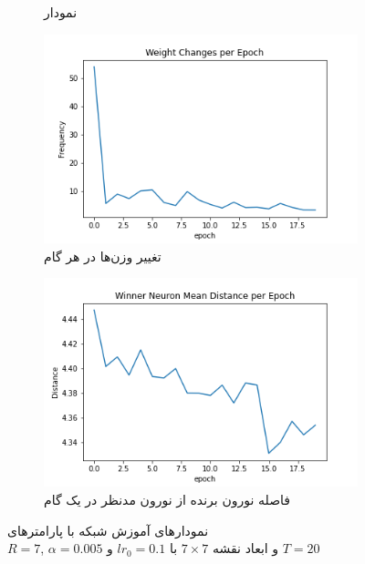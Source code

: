 \documentclass[12pt, a4paper]{article}
\begin{document}
\begin{figure}[h]
\begin{subfigure}{0.45\linewidth}
        \caption{نمودار }
    \end{subfigure}
    \newline
    \begin{subfigure}{0.45\linewidth}
        \includegraphics[width=\linewidth]{images/q5/r9/weight_change.png}
        \caption{تغییر وزن‌ها در هر گام}
    \end{subfigure}
    \hfill
    \begin{subfigure}{0.45\linewidth}
        \includegraphics[width=\linewidth]{images/q5/r9/winner_distance.png}
        \caption{فاصله نورون برنده از نورون مدنظر در یک گام}
    \end{subfigure}
    \caption{نمودار‌های آموزش شبکه  با پارامتر‌های \\$R=7$, $\alpha=0.005$ و ابعاد نقشه $7 \times 7$ با $lr_0=0.1$ و $T=20$}
    \label{r9}
\end{figure}
\end{document}
